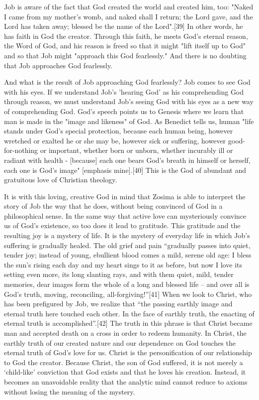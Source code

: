 Job is aware of the fact that God created the world and created him, too: "Naked I came from my mother’s womb, and naked shall I return; the Lord gave, and the Lord has taken away; blessed be the name of the Lord".[39] In other words, he has faith in God the creator. Through this faith, he meets God's eternal reason, the Word of God, and his reason is freed so that it might "lift itself up to God" and so that Job might "approach this God fearlessly." And there is no doubting that Job approaches God fearlessly.

And what is the result of Job approaching God fearlessly? Job comes to see God with his eyes. If we understand Job's 'hearing God' as his comprehending God through reason, we must understand Job's seeing God with his eyes as a new way of comprehending God. God's speech points us to Genesis where we learn that man is made in the "image and likeness" of God. As Benedict tells us, human "life stands under God's special protection, because each human being, however wretched or exalted he or she may be, however sick or suffering, however good-for-nothing or important, whether born or unborn, whether incurably ill or radiant with health - [because] each one bears God's breath in himself or herself, each one is God's image" [emphasis mine].[40] This is the God of abundant and gratuitous love of Christian theology.

It is with this loving, creative God in mind that Zosima is able to interpret the story of Job the way that  he does, without being convinced of God in a philosophical sense. In the same way that active love can mysteriously convince us of God’s existence, so too does it lead to gratitude. This gratitude and the resulting joy is a mystery of life.  It is the mystery of everyday life in which Job's suffering is gradually healed. The old grief and pain “gradually passes into quiet, tender joy; instead of young, ebullient blood comes a mild, serene old age: I bless the sun's rising each day and my heart sings to it as before, but now I love its setting even more, its long slanting rays, and with them quiet, mild, tender memories, dear images form the whole of a long and blessed life – and over all is God's truth, moving, reconciling, all-forgiving!”[41] When we look to Christ, who has been prefigured by Job, we realize that “the passing earthly image and eternal truth here touched each other. In the face of earthly truth, the enacting of eternal truth is accomplished”.[42]  The truth in this phrase is that Christ became man and accepted death on a cross in order to redeem humanity.  In Christ, the earthly truth of our created nature and our dependence on God touches the eternal truth of God’s love for us.  Christ is the personification of our relationship to God the creator.  Because Christ, the son of God suffered, it is not merely a ‘child-like’ conviction that God exists and that he loves his creation. Instead, it becomes an unavoidable reality that the analytic mind cannot reduce to axioms without losing the meaning of the mystery. 

